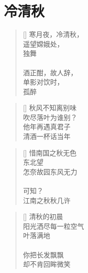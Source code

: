 \chapter{冷清秋}
\thispagestyle{empty}
\renewcommand{\poemtoc}{section}
\settowidth{\versewidth}{寒月夜，冷清秋}
\begin{verse}[\versewidth]
寒月夜，冷清秋，\\
遥望嫦娥处，\\
独舞\\
~\\
酒正酣，故人辞，\\
单影对饮时，\\
孤醉
\end{verse}

\renewcommand{\poemtoc}{section}
\settowidth{\versewidth}{秋风不知离别味}
\begin{verse}[\versewidth]
秋风不知离别味\\
吹尽落叶为谁别？\\
他年再遇真君子\\
清酒一杯话当年
\end{verse}

\renewcommand{\poemtoc}{section}
\settowidth{\versewidth}{惜南国之秋无色}
\begin{verse}[\versewidth]
惜南国之秋无色\\
东北望\\
怎奈故园东风无力\\
~\\
可知？\\
江南之秋秋几许
\end{verse}

\renewcommand{\poemtoc}{section}
\settowidth{\versewidth}{惜南国之秋无色}
\begin{verse}[\versewidth]
清秋的初晨\\
阳光洒尽每一粒空气\\
叶落满地\\
~\\
你把长发飘飘\\
却不肯回眸微笑
\end{verse}
